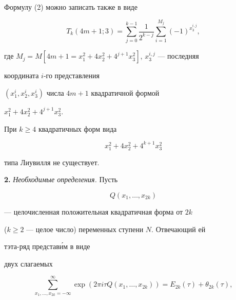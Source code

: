 \begin{notenonum}


Формулу (2) можно записать также в виде


$$


T_k(4m+1;3)=\sum^{k-1}_{j=0}\frac{1}{2^{k-j}}


\sum^{M_j}_{i=1}(-1)^{x^{i,j}_3},


$$


где $M_j=M[4m+1=x^2_1+4x^2_2+4^{j+1}x^2_3]$, $x^{i,j}_3$ --- последняя


координата $i$-го представления


$(x^i_1,x^i_2,x^i_3)$ числа $4m+1$ квадратичной формой


$x^2_1+4x^2_2+4^{j+1}x^2_3$.


\end{notenonum}





\begin{thm}


При $k\ge 4$ квадратичных форм вида


$$


x^2_1+4x^2_2+4^{k+1}x^2_3


$$


типа Лиувилля не существует.


\end{thm}





{\bf 2.} {\it Необходимые определения.} Пусть


\begin{equation}


Q(x_1,\dotsc,x_{2k})


\end{equation}


--- целочисленная положительная квадратичная форма от $2k$


($k\ge 2$ --- целое число) переменных ступени $N$. Отвечающий ей


тэта-ряд представ\'им в виде


двух слагаемых


\begin{equation}


\sum^\infty_{x_1,\dotsc,x_{2k}=-\infty}\exp(2\pi i\tau Q


(x_1,\dotsc,x_{2k}))=E_{2k}(\tau)+\theta_{2k}(\tau),


\end{equation}


